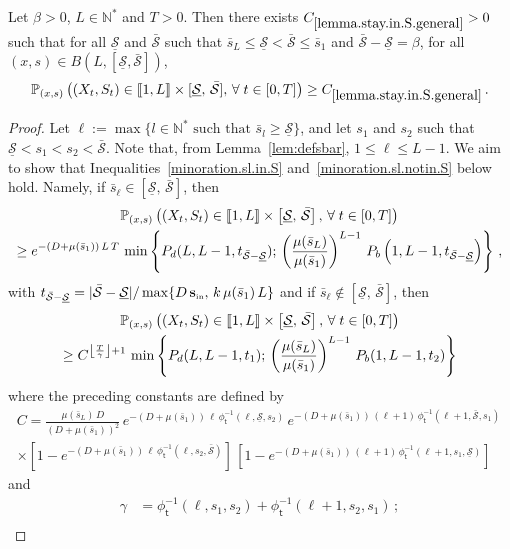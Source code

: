 \documentclass[AHL,Unicode,longabstracts,published]{cedram}
\newcommand{\llbracket}{\mathopen{[\mkern -2.7mu[}}
\newcommand{\rrbracket}{\mathclose{]\mkern -2.7mu]}}
\newcommand{\PP}{\mathbb{P}}
\newcommand{\NN}{\mathbb{N}}
\newcommand{\Sin}{{\mathbf s}_{\textrm{\tiny\rm in}}}
\newcommand{\Smin}{\underline{\mathcal{S}}}
\newcommand{\Smax}{\bar{\mathcal{S}}}
\newcommand{\barmu}{\mu(\bar s_1)}
\newcommand{\phit}{\phi_\textsf{t}^{-1}}
\newcommand{\setunL}{\llbracket 1, L\rrbracket}
\newcommand{\1}{\mathbf{1}}
\let\oldforall\forall
\renewcommand*{\forall}{\mathrel{\oldforall}}
\begin{document}
\begin{lemm}\label{lemma.stay.in.S.general}
Let $\beta>0$, $L\in\NN^*$ and $T>0$. Then there exists $C_{\ref{lemma.stay.in.S.general}}>0$ such that for all $\Smin$ and $\Smax$ such that $\bar s_L\leq \Smin < \Smax\leq \bar s_1$ and $\Smax-\Smin=\beta$, for all $(x,s) \in B(L,[\Smin,\Smax])$,
\[
\PP_{(x,s)}
\left(\left(X_t,S_t\right) \in \setunL\times [\Smin, \, \Smax],\,
\forall t\in[0,T]\right)\geq C_{\ref{lemma.stay.in.S.general}}\,.
\]
\end{lemm}
\begin{proof}
Let $\ell:= \max\{l \in \NN^* \text{ such that } \bar s_l \geq\Smin\}$, and let $s_1$ and $s_2$ such that $\Smin<s_1<s_2<\Smax$. Note that, from Lemma~\ref{lem:defsbar}, $1\leq \ell \leq L-1$. We aim to show that Inequalities~\eqref{minoration.sl.in.S} and~\eqref{minoration.sl.notin.S} below hold. Namely, if $\bar s_\ell \in [\Smin, \, \Smax]$, then
\begin{multline}\label{minoration.sl.in.S}
\PP_{(x,s)}
\left(\left(X_t,S_t\right) \in \setunL\times \left[\Smin, \, \Smax\right],\,
\forall t\in[0,T]\right)
\\
\geq e^{-(D+\barmu)\,L\,T}\, \min\left\{ P_d(L,L-1, t_{\Smax-\Smin});\,
\left(\frac{\mu(\bar s_L)}{\barmu}\right)^{L-1}\, P_b\left(1,L-1, t_{\Smax-\Smin}\right)
\right\}\,,
\end{multline}
with $t_{\Smax-\Smin}=|\Smax-\Smin|/\max\{D\,\Sin,\, k\,\barmu\,L\}$ and if $\bar s_\ell \notin [\Smin, \, \Smax]$, then
\begin{multline}\label{minoration.sl.notin.S}
\PP_{(x,s)}
\left(\left(X_t,S_t\right) \in \setunL\times \left[\Smin, \, \Smax\right],\,
\forall t\in[0,T]\right)
\\
\geq C^{\left\lfloor\frac{T}{\gamma}\right\rfloor+1}\,
\min\left\{P_d(L,L-1, t_1);\,
\left(\frac{\mu(\bar s_L)}{\barmu}\right)^{L-1}\,P_b(1,L-1, t_2)\right\}
\end{multline}
where the preceding constants are defined by
\begin{multline*}
C =
\frac{\mu(\bar s_L)\,D}{(D+\barmu)^2}\, e^{-(D+\barmu)\,\ell\,\phit(\ell,\Smin,s_2)} \, e^{-(D+\barmu)\,(\ell+1)\,\phit(\ell+1,\Smax,s_1)}\,
\\
\times \left[1-e^{-(D+\barmu)\,\ell\,\phit(\ell,s_2,\Smax)}\right]\,
\left[1- e^{-(D+\barmu)\,(\ell+1)\,\phit\left(\ell+1,s_1,\Smin\right)}\right]\;
\end{multline*}
and
\begin{align*}
\gamma &= \phit(\ell,s_1,s_2)+\phit(\ell+1,s_2,s_1)\,;
\\

\end{align*}
\end{proof}
\end{document}
